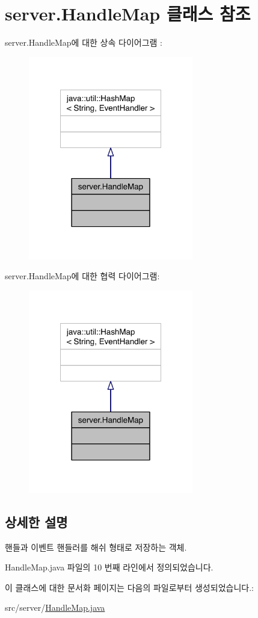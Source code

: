 \hypertarget{classserver_1_1_handle_map}{\section{server.\-Handle\-Map 클래스 참조}
\label{classserver_1_1_handle_map}
}


server.\-Handle\-Map에 대한 상속 다이어그램 \-: 
\nopagebreak
\begin{figure}[H]
\begin{center}
\leavevmode
\includegraphics[width=204pt]{classserver_1_1_handle_map__inherit__graph}
\end{center}
\end{figure}


server.\-Handle\-Map에 대한 협력 다이어그램\-:
\nopagebreak
\begin{figure}[H]
\begin{center}
\leavevmode
\includegraphics[width=204pt]{classserver_1_1_handle_map__coll__graph}
\end{center}
\end{figure}


\subsection{상세한 설명}
핸들과 이벤트 핸들러를 해쉬 형태로 저장하는 객체. 

Handle\-Map.\-java 파일의 10 번째 라인에서 정의되었습니다.



이 클래스에 대한 문서화 페이지는 다음의 파일로부터 생성되었습니다.\-:\begin{DoxyCompactItemize}
\item 
src/server/\hyperlink{_handle_map_8java}{Handle\-Map.\-java}\end{DoxyCompactItemize}
